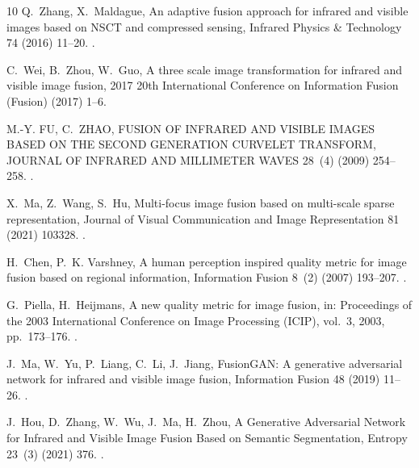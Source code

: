 \begin{thebibliography}{10}
Q.~Zhang, X.~Maldague, {An adaptive fusion approach for infrared and visible
  images based on NSCT and compressed sensing}, Infrared Physics \& Technology
  74 (2016) 11--20.
\newblock \href {https://doi.org/10.1016/j.infrared.2015.11.003}
  {}.

C.~Wei, B.~Zhou, W.~Guo, {A three scale image transformation for infrared and
  visible image fusion}, 2017 20th International Conference on Information
  Fusion (Fusion) (2017) 1--6\newblock \href {https://doi.org/10.23919/icif.2017.8009748}
  {}.

M.-Y. FU, C.~ZHAO, {FUSION OF INFRARED AND VISIBLE IMAGES BASED ON THE SECOND
  GENERATION CURVELET TRANSFORM}, JOURNAL OF INFRARED AND MILLIMETER WAVES
  28~(4) (2009) 254--258.
\newblock \href {https://doi.org/10.3724/sp.j.1010.2009.00254}
  {}.

X.~Ma, Z.~Wang, S.~Hu, {Multi-focus image fusion based on multi-scale sparse
  representation}, Journal of Visual Communication and Image Representation 81
  (2021) 103328.
\newblock \href {https://doi.org/10.1016/j.jvcir.2021.103328}
  {}.

H.~Chen, P.~K. Varshney, {A human perception inspired quality metric for image
  fusion based on regional information}, Information Fusion 8~(2) (2007)
  193--207.
\newblock \href {https://doi.org/10.1016/j.inffus.2005.10.001}
  {}.

G.~Piella, H.~Heijmans, {A new quality metric for image fusion}, in: Proceedings
  of the 2003 International Conference on Image Processing (ICIP), vol.~3, 2003,
  pp.~173--176.
\newblock \href {https://doi.org/10.1109/ICIP.2003.1247209}
  {}.

J.~Ma, W.~Yu, P.~Liang, C.~Li, J.~Jiang, {FusionGAN: A generative adversarial
  network for infrared and visible image fusion}, Information Fusion 48 (2019)
  11--26.
\newblock \href {https://doi.org/10.1016/j.inffus.2018.09.004}
  {}.

J.~Hou, D.~Zhang, W.~Wu, J.~Ma, H.~Zhou, {A Generative Adversarial Network for
  Infrared and Visible Image Fusion Based on Semantic Segmentation}, Entropy
  23~(3) (2021) 376.
\newblock \href {https://doi.org/10.3390/e23030376}
  {}.


\end{thebibliography}
